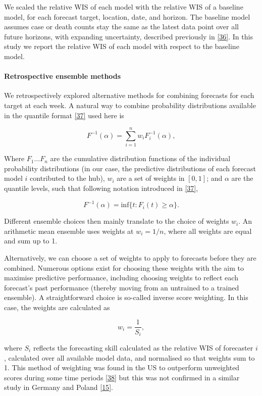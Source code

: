 \documentclass[
]{article}
\begin{document}
We scaled the relative WIS of each model with the relative WIS of a baseline model, for each forecast target, location, date, and horizon. The baseline model assumes case or death counts stay the same as the latest data point over all future horizons, with expanding uncertainty, described previously in \protect\hyperlink{ref-cramerEvaluationIndividualEnsemble2021}{{[}36{]}}. In this study we report the relative WIS of each model with respect to the baseline model.

\hypertarget{retrospective-ensemble-methods}{%
\paragraph{Retrospective ensemble methods}\label{retrospective-ensemble-methods}}

We retrospectively explored alternative methods for combining forecasts for each target at each week. A natural way to combine probability distributions available in the quantile format \protect\hyperlink{ref-genestVincentizationRevisited1992}{{[}37{]}} used here is

\[F^{-1}(\alpha) = \sum_{i=1}^{n}w_i F_i^{-1}(\alpha),\]

Where \(F_{1} \ldots F_{n}\) are the cumulative distribution functions of the individual probability distributions (in our case, the predictive distributions of each forecast model \(i\) contributed to the hub), \(w_i\) are a set of weights in \([0,1]\); and \(\alpha\) are the quantile levels, such that following notation introduced in \protect\hyperlink{ref-genestVincentizationRevisited1992}{{[}37{]}},

\[F^{-1}(\alpha) = \mathrm{inf} \{t : F_i(t) \geq \alpha \}.\]

Different ensemble choices then mainly translate to the choice of weights \(w_i\). An arithmetic mean ensemble uses weights at \(w_i=1/n\), where all weights are equal and sum up to 1.

Alternatively, we can choose a set of weights to apply to forecasts before they are combined. Numerous options exist for choosing these weights with the aim to maximise predictive performance, including choosing weights to reflect each forecast's past performance (thereby moving from an untrained to a trained ensemble). A straightforward choice is so-called inverse score weighting. In this case, the weights are calculated as

\[w_i = \frac{1}{S_i},\]

where \(S_i\) reflects the forecasting skill calculated as the relative WIS of forecaster \(i\), calculated over all available model data, and normalised so that weights sum to 1. This method of weighting was found in the US to outperform unweighted scores during some time periods \protect\hyperlink{ref-taylorCombiningProbabilisticForecasts2021}{{[}38{]}} but this was not confirmed in a similar study in Germany and Poland \protect\hyperlink{ref-bracherPreregisteredShorttermForecasting2021}{{[}15{]}}.
\end{document}
